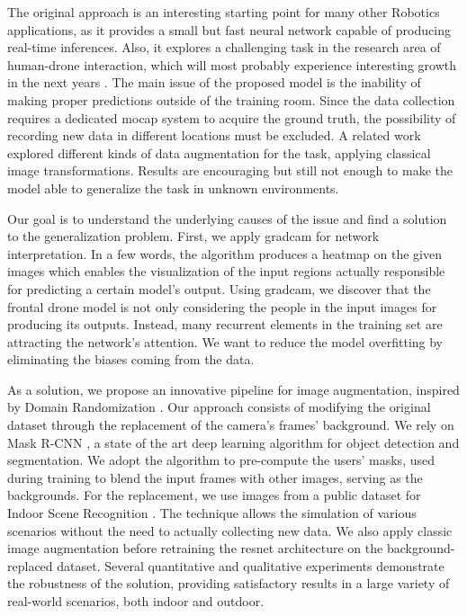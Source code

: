 The original approach is an interesting starting point for many other Robotics applications, as it provides a small but fast neural network capable of producing real-time inferences. Also, it explores a challenging task in the research area of human-drone interaction, which will most probably experience interesting growth in the next years \cite{human-drone-sota}. The main issue of the proposed model is the inability of making proper predictions outside of the training room. Since the data collection requires a dedicated \gls{mocap} system to acquire the ground truth, the possibility of recording new data in different locations must be excluded. A related work \cite{zimmerman2020thesis} explored different kinds of data augmentation for the task, applying classical image transformations. Results are encouraging but still not enough to make the model able to generalize the task in unknown environments.

\medskip

Our goal is to understand the underlying causes of the issue and find a solution to the generalization problem. First, we apply \gls{gradcam} \cite{Selvaraju_2019} for network interpretation. In a few words, the algorithm produces a heatmap on the given images which enables the visualization of the input regions actually responsible for predicting a certain model’s output. Using \gls{gradcam}, we discover that the frontal drone model is not only considering the people in the input images for producing its outputs. Instead, many recurrent elements in the training set are attracting the network's attention. We want to reduce the model overfitting by eliminating the biases coming from the data. 

As a solution, we propose an innovative pipeline for image augmentation, inspired by Domain Randomization \cite{weng2019DR}. Our approach consists of modifying the original dataset through the replacement of the camera's frames' background. We rely on Mask R-CNN \cite{he2018mask}, a state of the art deep learning algorithm for object detection and segmentation. We adopt the algorithm to pre-compute the users' masks, used during training to blend the input frames with other images, serving as the backgrounds. For the replacement, we use images from a public dataset for Indoor Scene Recognition \cite{cvpr09}. The technique allows the simulation of various scenarios without the need to actually collecting new data. We also apply classic image augmentation before retraining the \gls{resnet} architecture on the background-replaced dataset. Several quantitative and qualitative experiments demonstrate the robustness of the solution, providing satisfactory results in a large variety of real-world scenarios, both indoor and outdoor.

